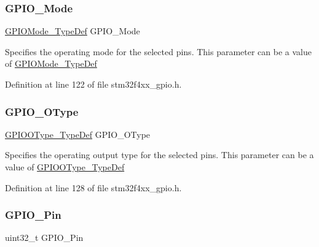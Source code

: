 \subsubsection{\texorpdfstring{G\+P\+I\+O\+\_\+\+Mode}{GPIO\_Mode}}
{\footnotesize\ttfamily \hyperlink{group___g_p_i_o_ga1347339e1c84a196fabbb31205eec5d4}{G\+P\+I\+O\+Mode\+\_\+\+Type\+Def} G\+P\+I\+O\+\_\+\+Mode}

Specifies the operating mode for the selected pins. This parameter can be a value of \hyperlink{group___g_p_i_o_ga1347339e1c84a196fabbb31205eec5d4}{G\+P\+I\+O\+Mode\+\_\+\+Type\+Def} 

Definition at line 122 of file stm32f4xx\+\_\+gpio.\+h.

\mbox{\label{struct_g_p_i_o___init_type_def_a321a268abbed3d2f01c27383e8daf92d}} 
\subsubsection{\texorpdfstring{G\+P\+I\+O\+\_\+\+O\+Type}{GPIO\_OType}}
{\footnotesize\ttfamily \hyperlink{group___g_p_i_o_gae74212e8d66c389f47326b06bdf6d2ab}{G\+P\+I\+O\+O\+Type\+\_\+\+Type\+Def} G\+P\+I\+O\+\_\+\+O\+Type}

Specifies the operating output type for the selected pins. This parameter can be a value of \hyperlink{group___g_p_i_o_gae74212e8d66c389f47326b06bdf6d2ab}{G\+P\+I\+O\+O\+Type\+\_\+\+Type\+Def} 

Definition at line 128 of file stm32f4xx\+\_\+gpio.\+h.

\mbox{\label{struct_g_p_i_o___init_type_def_a15699fc7e215ac2579cd24ca76cd4591}} 
\subsubsection{\texorpdfstring{G\+P\+I\+O\+\_\+\+Pin}{GPIO\_Pin}}
{\footnotesize\ttfamily uint32\+\_\+t G\+P\+I\+O\+\_\+\+Pin}

